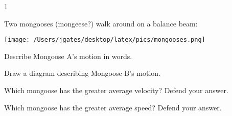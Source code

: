 
\AddToShipoutPicture*{\BackgroundPic}

\addtocounter {ProbNum} {1}

 
{\bf \Large{}} Two mongooses (mongeese?) walk around on a balance beam:

\begin{center} 
\texttt{[image: /Users/jgates/desktop/latex/pics/mongooses.png]}
\end{center}

\bigskip
Describe Mongoose A's motion in words.

\vfill
Draw a diagram describing Mongoose B's motion.

\vfill
Which mongoose has the greater average velocity?  Defend your answer.

\vfill
Which mongoose has the greater average speed?  Defend your answer.

\vfill

\newpage
